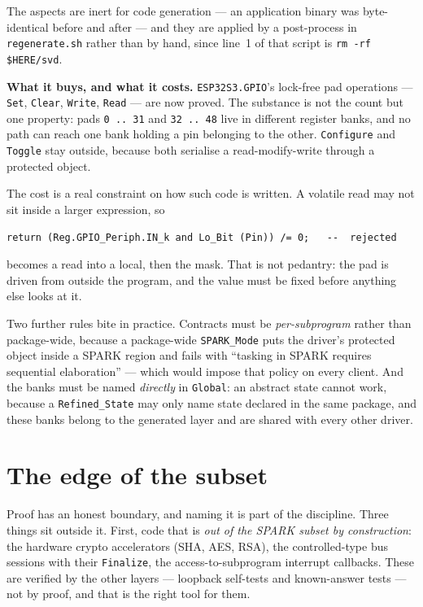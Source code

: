 The aspects are inert for code generation --- an application binary was byte-identical
before and after --- and they are applied by a post-process in
\texttt{regenerate.sh} rather than by hand, since line~1 of that script is
\lstinline{rm -rf $HERE/svd}.

\textbf{What it buys, and what it costs.} \lstinline{ESP32S3.GPIO}'s lock-free pad
operations --- \lstinline{Set}, \lstinline{Clear}, \lstinline{Write}, \lstinline{Read}
--- are now proved. The substance is not the count but one property: pads
\texttt{0\,..\,31} and \texttt{32\,..\,48} live in different register banks, and no path
can reach one bank holding a pin belonging to the other. \lstinline{Configure} and
\lstinline{Toggle} stay outside, because both serialise a read-modify-write through a
protected object.

The cost is a real constraint on how such code is written. A volatile read may not sit
inside a larger expression, so

\begin{lstlisting}
return (Reg.GPIO_Periph.IN_k and Lo_Bit (Pin)) /= 0;   --  rejected
\end{lstlisting}

\noindent becomes a read into a local, then the mask. That is not pedantry: the pad is
driven from outside the program, and the value must be fixed before anything else looks
at it.

Two further rules bite in practice. Contracts must be \emph{per-subprogram} rather than
package-wide, because a package-wide \lstinline{SPARK_Mode} puts the driver's protected
object inside a SPARK region and fails with ``tasking in SPARK requires sequential
elaboration'' --- which would impose that policy on every client. And the banks must be
named \emph{directly} in \lstinline{Global}: an abstract state cannot work, because a
\lstinline{Refined_State} may only name state declared in the same package, and these
banks belong to the generated layer and are shared with every other driver.

\section{The edge of the subset}

Proof has an honest boundary, and naming it is part of the discipline. Three things sit
outside it. First, code that is \emph{out of the SPARK subset by construction}: the
hardware crypto accelerators (SHA, AES, RSA), the controlled-type bus sessions with
their \lstinline{Finalize}, the access-to-subprogram interrupt callbacks. These are
verified by the other layers --- loopback self-tests and known-answer tests --- not by
proof, and that is the right tool for them.

